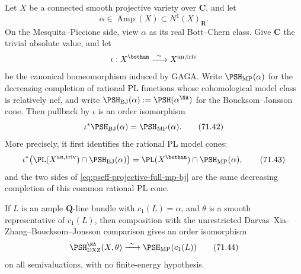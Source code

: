 \begin{theorem}\label{thm:pseff-projective-full-mp-bj}
Let \(X\) be a connected smooth projective variety over \(\mathbf C\), and
let
\[
                 \alpha\in\operatorname{Amp}(X)
                         \subset N^1(X)_{\mathbf R}.
\]
On the Mesquita--Piccione side, view \(\alpha\) as its real Bott--Chern
class.  Give \(\mathbf C\) the trivial absolute value, and let
\[
 \iota:X^{\bethan}\xrightarrow{\ \sim\ }X^{\mathrm{an,triv}}
\]
be the canonical homeomorphism induced by GAGA.  Write
\(\PSH_{\mathrm{MP}}(\alpha)\) for the decreasing completion of rational
PL functions whose cohomological model class is relatively nef, and write
\(\PSH_{\mathrm{BJ}}(\alpha):=\PSH(\alpha^{\NA})\) for the
Boucksom--Jonsson cone.  Then pullback by \(\iota\) is an order
isomorphism
\[
 \iota^*\PSH_{\mathrm{BJ}}(\alpha)
       =\PSH_{\mathrm{MP}}(\alpha).
\tag{71.42}\label{eq:pseff-projective-full-mp-bj}
\]
More precisely, it first identifies the rational PL model cones:
\[
 \iota^*\bigl(\PL(X^{\mathrm{an,triv}})
          \cap\PSH_{\mathrm{BJ}}(\alpha)\bigr)
 =\PL(X^{\bethan})\cap\PSH_{\mathrm{MP}}(\alpha),
\tag{71.43}\label{eq:pseff-projective-model-mp-bj}
\]
and the two sides of
\eqref{eq:pseff-projective-full-mp-bj} are the same decreasing completion
of this common rational PL cone.

If \(L\) is an ample \(\mathbf Q\)-line bundle with
\(c_1(L)=\alpha\), and \(\theta\) is a smooth representative of
\(c_1(L)\), then composition with the unrestricted
Darvas--Xia--Zhang--Boucksom--Jonsson comparison gives an order
isomorphism
\[
 \PSH^{\NA}_{\mathrm{DXZ}}(X,\theta)
       \xrightarrow{\ \sim\ }
 \PSH_{\mathrm{MP}}(c_1(L))
\tag{71.44}\label{eq:pseff-projective-dxz-mp-bijection}
\]
on all semivaluations, with no finite-energy hypothesis.
\end{theorem}

